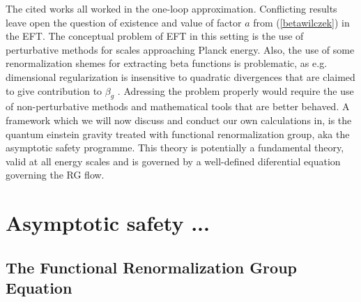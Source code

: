 \documentclass[11pt, a4paper]{article}
\begin{document}
The cited works all worked in the one-loop approximation.
Conflicting results leave open the question of existence and value of factor $a$ from (\ref{betawilczek}) in the EFT.
The conceptual problem of EFT in this setting is the use of perturbative methods for scales approaching Planck energy.
Also, the use of some renormalization shemes for extracting beta functions is problematic, as e.g. dimensional regularization is insensitive to quadratic
divergences that are claimed to give contribution to $\beta_g$ \cite{absence}.
Adressing the problem properly would require the use of non-perturbative methods and mathematical tools that are better behaved.
A framework which we will now discuss and conduct our own calculations in, is the quantum einstein gravity treated with functional renormalization group, aka the asymptotic safety programme.
This theory is potentially a fundamental theory, valid at all energy scales \cite{qeg} and is governed by a well-defined diferential equation governing the RG flow.





\section{Asymptotic safety ...}

\subsection{The Functional Renormalization Group Equation}
\end{document}
